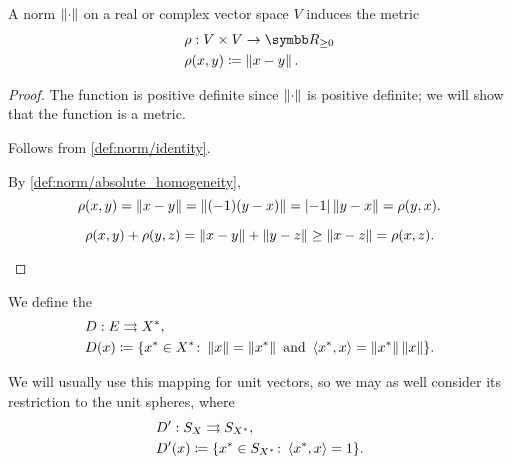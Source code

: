 \begin{definition}\label{def:norm_induced_metric}
  A norm \( \left\Vert \cdot \right\Vert \) on a real or complex vector space \( V \) induces the metric
  \begin{align*}
    &\rho: V \times V \to \R_{\geq 0} \\
    &\rho(x, y) \coloneqq \Norm{x - y}.
  \end{align*}
\end{definition}
\begin{proof}
  The function is positive definite since \( \left\Vert \cdot \right\Vert \) is positive definite; we will show that the function is a metric.

  \begin{description}
     Follows from \cref{def:norm/identity}.

     By \ref{def:norm/absolute_homogeneity},
    \begin{equation*}
      \rho(x, y) = \left\Vert  x - y  \right\Vert = \left\Vert  (-1) (y - x)  \right\Vert = \left\vert -1 \right\vert \left\Vert y - x \right\Vert = \rho(y, x).
    \end{equation*}

    \begin{equation*}
      \rho(x, y) + \rho(y, z) = \left\Vert x - y \right\Vert + \left\Vert y - z \right\Vert \geq \left\Vert x - z \right\Vert = \rho(x, z).
    \end{equation*}
  \end{description}
\end{proof}

\begin{definition}\cite[Example 2.26]{Phelps1993}
  We define the 
  \begin{align*}
    &D: E \rightrightarrows X^*, \\
    &D(x) \coloneqq \{ x^* \in X^* \colon \left\Vert x \right\Vert = \left\Vert x^* \right\Vert \text{ and } \left\langle x^*, x \right\rangle = \left\Vert x^* \right\Vert \left\Vert x \right\Vert \}.
  \end{align*}

  We will usually use this mapping for unit vectors, so we may as well consider its restriction to the unit spheres, where
  \begin{align*}
    &D': S_X \rightrightarrows S_{X^*}, \\
    &D'(x) \coloneqq \{ x^* \in S_{X^*} \colon \left\langle x^*, x \right\rangle = 1 \}.
  \end{align*}
\end{definition}

